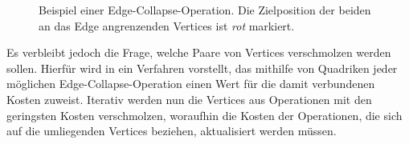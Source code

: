 \begin{figure}
\centering
{}
\qquad
{}
\caption{Beispiel einer Edge-Collapse-Operation. Die Zielposition der beiden an das Edge angrenzenden Vertices ist \emph{rot} markiert.}
\label{schlenke:fig:fundamentals:edgecollapse}
\end{figure}

Es verbleibt jedoch die Frage, welche Paare von Vertices verschmolzen werden sollen. Hierfür wird in \cite{garland1997} ein Verfahren vorstellt, das mithilfe von Quadriken jeder möglichen Edge-Collapse-Operation einen Wert für die damit verbundenen Kosten zuweist. Iterativ werden nun die Vertices aus Operationen mit den geringsten Kosten verschmolzen, woraufhin die Kosten der Operationen, die sich auf die umliegenden Vertices beziehen, aktualisiert werden müssen.

